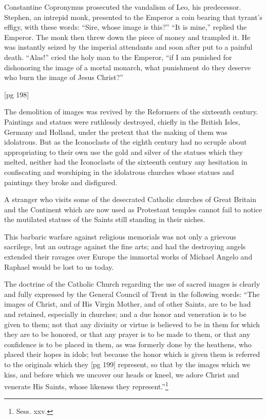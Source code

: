Constantine Copronymus prosecuted the vandalism
of Leo, his predecessor. Stephen, an intrepid
monk, presented to the Emperor a coin
bearing that tyrant's effigy, with these words:
“Sire, whose image is this?” “It is mine,” replied
the Emperor. The monk then threw down
the piece of money and trampled it. He was instantly
seized by the imperial attendants and soon
after put to a painful death. “Alas!” cried the
holy man to the Emperor, “if I am punished for
dishonoring the image of a mortal monarch, what
punishment do they deserve who burn the image
of Jesus Christ?”

[pg 198]

The demolition of images was revived by the
Reformers of the sixteenth century. Paintings
and statues were ruthlessly destroyed, chiefly in
the British Isles, Germany and Holland, under
the pretext that the making of them was idolatrous.
But as the Iconoclasts of the eighth century
had no scruple about appropriating to their
own use the gold and silver of the statues which
they melted, neither had the Iconoclasts of the
sixteenth century any hesitation in confiscating
and worshiping in the idolatrous churches whose
statues and paintings they broke and disfigured.

A stranger who visits some of the desecrated
Catholic churches of Great Britain and the Continent
which are now used as Protestant temples
cannot fail to notice the mutilated statues of
the Saints still standing in their niches.

This barbaric warfare against religious memorials
was not only a grievous sacrilege, but an outrage
against the fine arts; and had the destroying
angels extended their ravages over Europe the
immortal works of Michael Angelo and Raphael
would be lost to us today.

The doctrine of the Catholic Church regarding
the use of sacred images is clearly and fully expressed
by the General Council of Trent in the
following words: “The images of Christ, and of
His Virgin Mother, and of other Saints, are to
be had and retained, especially in churches; and
a due honor and veneration is to be given to them;
not that any divinity or virtue is believed to be
in them for which they are to be honored, or that
any prayer is to be made to them, or that any
confidence is to be placed in them, as was formerly
done by the heathens, who placed their
hopes in idols; but because the honor which is
given them is referred to the originals which they
[pg 199]
represent, so that by the images which we kiss,
and before which we uncover our heads or kneel,
we adore Christ and venerate His Saints, whose
likeness they represent.”\footnote{Sess. xxv.}

